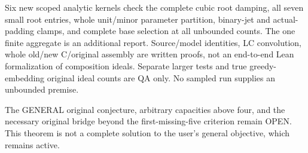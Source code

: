 Six new scoped analytic kernels check the complete cubic root
damping, all seven small root entries, whole unit/minor parameter
partition, binary-jet and actual-padding clamps, and complete
base selection at all unbounded counts. The one finite aggregate
is an additional report. Source/model identities, LC convolution,
whole old/new C/original assembly are written proofs, not an
end-to-end Lean formalization of composition ideals.
Separate larger tests and true greedy-embedding original ideal
counts are QA only. No sampled run supplies an unbounded premise.

The GENERAL original conjecture, arbitrary capacities above four,
and the necessary original bridge beyond the first-missing-five
criterion remain OPEN. This theorem is not a complete solution
to the user's general objective, which remains active.
